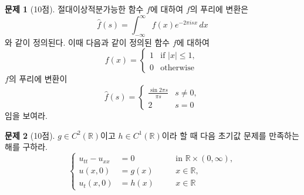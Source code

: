 \documentclass[b4paper,twocolumn]{oblivoir}
\theoremstyle{definition}
\newtheorem{problem}{문제}
\newcommand{\myd}[1]{\,d{#1}}
\begin{document}

\begin{problem}[10점]
절대이상적분가능한 함수 $f$에 대하여 $f$의 푸리에 변환은 
\[ \hat{f}(s)=\int_{-\infty}^{\infty} f(x)e^{-2\pi isx}\myd{x} \]
와 같이 정의된다. 이때 다음과 같이 정의된 함수 $f$에 대하여 
\[
    f(x)=\begin{cases}
        1 & \text{if } |x|\leq 1, \\
        0 & \text{otherwise }
    \end{cases}
\]
$f$의 푸리에 변환이 
\[   
    \hat{f}(s)
    =\begin{cases}
        \frac{\sin 2\pi s}{\pi s} & s\neq 0, \\
        2                         & s=0
    \end{cases}   \]
임을 보여라. 
\end{problem}
\newpage

\begin{problem}[10점]
$g\in C^2(\mathbb{R})$이고 $h\in C^1(\mathbb{R})$이라 할 때 다음 초기값 문제를 만족하는 해를 구하라. 
\[ \left\{
    \begin{alignedat}{2}
        u_{tt}-u_{xx}&=0 &&\quad \text{in } \mathbb{R}\times (0,\infty),\\
        u(x,0)&=g(x) &&\quad x\in \mathbb{R},\\
        u_t(x,0)&=h(x) &&\quad x\in \mathbb{R}
    \end{alignedat}
    \right. \]
\end{problem}
\newpage 
\end{document}
